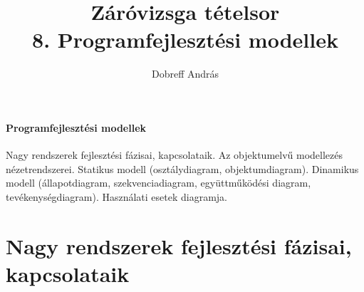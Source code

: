 \documentclass[margin=0px]{article}
\title{Záróvizsga tételsor \\ \large 8. Programfejlesztési modellek}
\date{}
\author{Dobreff András}
\newenvironment{tetel}[1]{\paragraph{#1 \\}}{}
\begin{document}
	\maketitle
	
	\begin{tetel}{Programfejlesztési modellek}
			Nagy rendszerek fejlesztési fázisai, kapcsolataik. Az objektumelvű modellezés nézetrendszerei. Statikus modell (osztálydiagram, objektumdiagram). Dinamikus modell (állapotdiagram, szekvenciadiagram, együttműködési diagram, tevékenységdiagram). Használati esetek diagramja.
	\end{tetel}
	
	\section{Nagy rendszerek fejlesztési fázisai, kapcsolataik}
	
\end{document}
